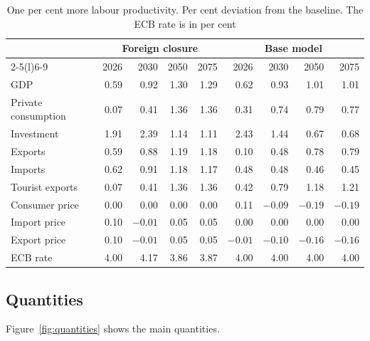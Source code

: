\documentclass[11pt,a4paper]{article}
\begin{document}
\begin{table}[H]
\centering
\small
\caption{One per cent more labour productivity. Per cent deviation from the baseline. The ECB rate is in per cent}
\label{tab:results}
\begin{tabular}{@{}lrrrrrrrr@{}}
\toprule
 & \multicolumn{4}{c}{Foreign closure} & \multicolumn{4}{c}{Base model} \\
\cmidrule(lr){2-5}\cmidrule(l){6-9}
 & 2026 & 2030 & 2050 & 2075 & 2026 & 2030 & 2050 & 2075 \\
\midrule
GDP & 0.59 & 0.92 & 1.30 & 1.29 & 0.62 & 0.93 & 1.01 & 1.01 \\
Private consumption & 0.07 & 0.41 & 1.36 & 1.36 & 0.31 & 0.74 & 0.79 & 0.77 \\
Investment & 1.91 & 2.39 & 1.14 & 1.11 & 2.43 & 1.44 & 0.67 & 0.68 \\
Exports & 0.59 & 0.88 & 1.19 & 1.18 & 0.10 & 0.48 & 0.78 & 0.79 \\
Imports & 0.62 & 0.91 & 1.18 & 1.17 & 0.48 & 0.48 & 0.46 & 0.45 \\
Tourist exports & 0.07 & 0.41 & 1.36 & 1.36 & 0.42 & 0.79 & 1.18 & 1.21 \\
\midrule
Consumer price & 0.00 & 0.00 & 0.00 & 0.00 & 0.11 & $-0.09$ & $-0.19$ & $-0.19$ \\
Import price & 0.10 & $-0.01$ & 0.05 & 0.05 & 0.00 & 0.00 & 0.00 & 0.00 \\
Export price & 0.10 & $-0.01$ & 0.05 & 0.05 & $-0.01$ & $-0.10$ & $-0.16$ & $-0.16$ \\
ECB rate & 4.00 & 4.17 & 3.86 & 3.87 & 4.00 & 4.00 & 4.00 & 4.00 \\
\bottomrule
\end{tabular}
\end{table}

\subsection{Quantities}

Figure~\ref{fig:quantities} shows the main quantities.
\end{document}
